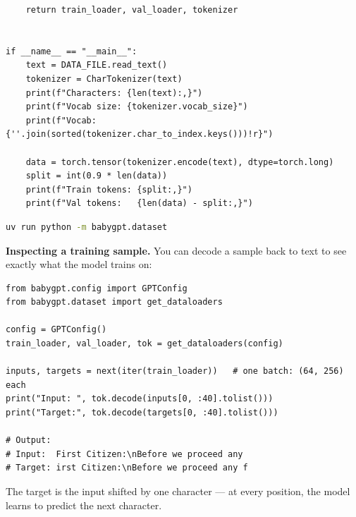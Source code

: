\begin{lstlisting}
    return train_loader, val_loader, tokenizer


if __name__ == "__main__":
    text = DATA_FILE.read_text()
    tokenizer = CharTokenizer(text)
    print(f"Characters: {len(text):,}")
    print(f"Vocab size: {tokenizer.vocab_size}")
    print(f"Vocab: {''.join(sorted(tokenizer.char_to_index.keys()))!r}")

    data = torch.tensor(tokenizer.encode(text), dtype=torch.long)
    split = int(0.9 * len(data))
    print(f"Train tokens: {split:,}")
    print(f"Val tokens:   {len(data) - split:,}")
\end{lstlisting}

\shelltag
\begin{lstlisting}[language=bash]
uv run python -m babygpt.dataset
\end{lstlisting}


\textbf{Inspecting a training sample.} You can decode a sample back to text to see exactly what the model trains on:

\demotag
\begin{lstlisting}
from babygpt.config import GPTConfig
from babygpt.dataset import get_dataloaders

config = GPTConfig()
train_loader, val_loader, tok = get_dataloaders(config)

inputs, targets = next(iter(train_loader))   # one batch: (64, 256) each
print("Input: ", tok.decode(inputs[0, :40].tolist()))
print("Target:", tok.decode(targets[0, :40].tolist()))

# Output:
# Input:  First Citizen:\nBefore we proceed any
# Target: irst Citizen:\nBefore we proceed any f
\end{lstlisting}

The target is the input shifted by one character --- at every position, the model learns to predict the next character.

